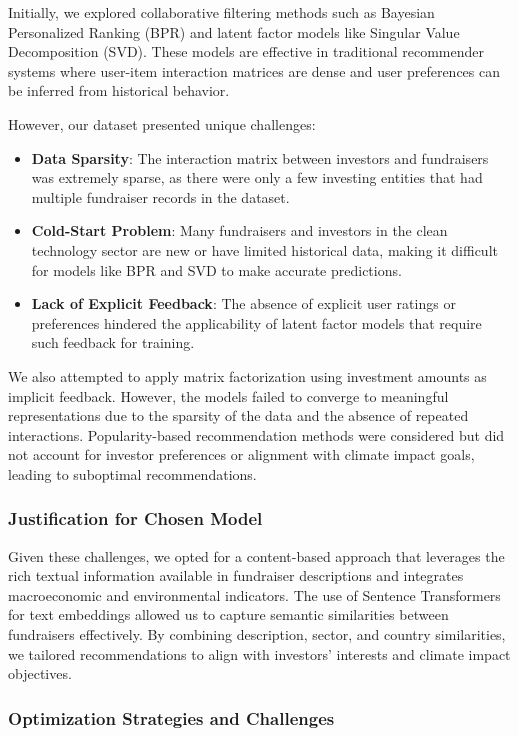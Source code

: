 \documentclass[sigconf]{acmart}
\begin{document}
Initially, we explored collaborative filtering methods such as Bayesian Personalized Ranking (BPR) and latent factor models like Singular Value Decomposition (SVD). These models are effective in traditional recommender systems where user-item interaction matrices are dense and user preferences can be inferred from historical behavior.

However, our dataset presented unique challenges:

\begin{itemize}
    \item \textbf{Data Sparsity}: The interaction matrix between investors and fundraisers was extremely sparse, as there were only a few investing entities that had multiple fundraiser records in the dataset.
    \item \textbf{Cold-Start Problem}: Many fundraisers and investors in the clean technology sector are new or have limited historical data, making it difficult for models like BPR and SVD to make accurate predictions.
    \item \textbf{Lack of Explicit Feedback}: The absence of explicit user ratings or preferences hindered the applicability of latent factor models that require such feedback for training.
\end{itemize}

We also attempted to apply matrix factorization using investment amounts as implicit feedback. However, the models failed to converge to meaningful representations due to the sparsity of the data and the absence of repeated interactions. Popularity-based recommendation methods were considered but did not account for investor preferences or alignment with climate impact goals, leading to suboptimal recommendations.

\subsubsection{Justification for Chosen Model}

Given these challenges, we opted for a content-based approach that leverages the rich textual information available in fundraiser descriptions and integrates macroeconomic and environmental indicators. The use of Sentence Transformers for text embeddings allowed us to capture semantic similarities between fundraisers effectively. By combining description, sector, and country similarities, we tailored recommendations to align with investors' interests and climate impact objectives.

\subsubsection{Optimization Strategies and Challenges}
\end{document}
